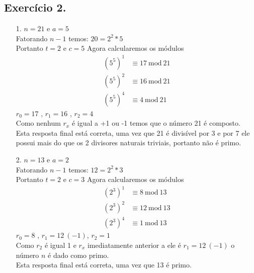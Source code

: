 \documentclass[12pt]{article}
\begin{document}
\subsection*{Exercício 2.}
	\begin{itemize}
		\item[1. ]
			$n = 21$ e $a = 5$\\
			Fatorando $n-1$ temos: $20 = 2^2*5$\\
			Portanto $t = 2$ e $c = 5$
			Agora calcularemos os módulos
			\begin{align*}
				(5^5)^1 &\equiv 17 \ \mathrm{mod} \ 21 \\
				(5^5)^2 &\equiv 16 \ \mathrm{mod} \ 21 \\
				(5^5)^4 &\equiv 4 \ \mathrm{mod} \ 21
			\end{align*}
			$r_0 = 17$ , $r_1 = 16$ , $r_2 = 4$\\
			Como nenhum $r_x$ é igual a +1 ou -1 temos que o número 21 é composto.\\
			Esta resposta final está correta, uma vez que 21 é divisível por 3 e por 7
			ele possui mais do que os 2 divisores naturais triviais, portanto não é primo.
		\item[2. ]
			$n = 13$ e $a = 2$\\
			Fatorando $n-1$ temos: $12 = 2^2*3$\\
			Portanto $t = 2$ e $c = 3$
			Agora calcularemos os módulos
			\begin{align*}
				(2^3)^1 &\equiv 8 \ \mathrm{mod} \ 13 \\
				(2^3)^2 &\equiv 12 \ \mathrm{mod} \ 13 \\
				(2^3)^4 &\equiv 1 \ \mathrm{mod} \ 13
			\end{align*}
			$r_0 = 8$ , $r_1 = 12 \ (-1)$, $r_2 = 1$\\
			Como $r_2$ é igual 1 e $r_x$ imediatamente anterior a ele é 
			$r_1 = 12 \ (-1)$ o número $n$ é dado como primo.\\
			Esta resposta final está correta, uma vez que 13 é primo.	
	\end{itemize}
\end{document}
